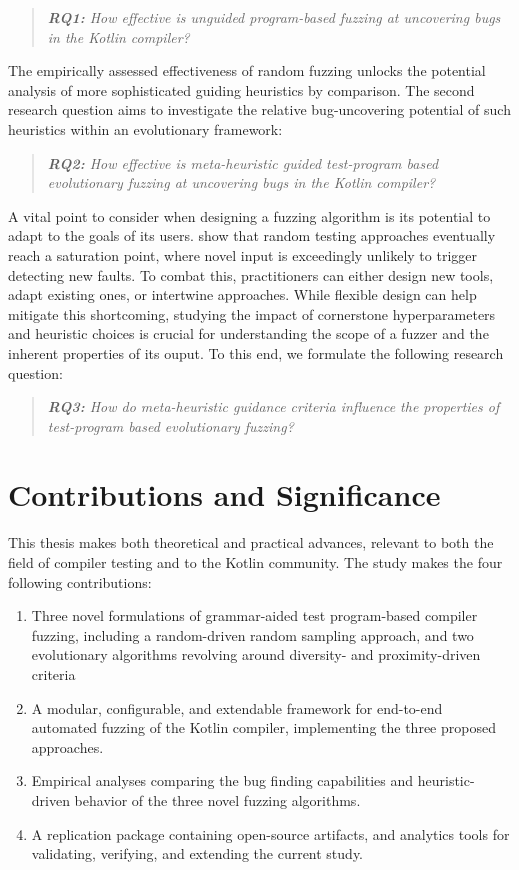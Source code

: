 \begin{quote}
\centering 
\emph{\textbf{RQ1:} How effective is unguided program-based
fuzzing at uncovering bugs in the Kotlin compiler?}
\end{quote}

The empirically assessed effectiveness of random fuzzing
unlocks the potential analysis of more sophisticated guiding
heuristics by comparison.
The second research question aims to investigate
the relative bug-uncovering potential of such heuristics
within an evolutionary framework:


\begin{quote}
\centering 
\emph{\textbf{RQ2:} How effective is meta-heuristic
guided test-program based evolutionary fuzzing
at uncovering bugs in the Kotlin compiler?}
\end{quote}

A vital point to consider when designing a fuzzing algorithm is
its potential to adapt to the goals of its users. \citet{amalfitano2015exploiting}
show that random testing approaches eventually reach a
saturation point, where novel input is exceedingly unlikely to trigger
detecting new faults. 
To combat this, practitioners can either design new tools, adapt existing
ones, or intertwine approaches.
While flexible design can help mitigate this shortcoming, studying the 
impact of cornerstone hyperparameters and heuristic choices
is crucial for understanding the scope of a fuzzer and the
inherent properties of its ouput.
To this end, we formulate the following research question:

\begin{quote}
\centering 
\emph{\textbf{RQ3:} How do meta-heuristic guidance
criteria influence the properties of test-program based
evolutionary fuzzing?}
\end{quote}

\section{Contributions and Significance}

This thesis makes both theoretical and practical advances,
relevant to both the field of compiler testing and to the 
Kotlin community.
The study makes the four following contributions:

\begin{enumerate}
	\item Three novel formulations of grammar-aided test program-based compiler fuzzing,
including a random-driven random sampling approach,
and two evolutionary algorithms revolving
around diversity- and proximity-driven criteria
	\item A modular, configurable, and extendable framework for
end-to-end automated fuzzing of the Kotlin compiler,
implementing the three proposed approaches.
	\item Empirical analyses comparing the bug finding capabilities
and heuristic-driven behavior of the three novel fuzzing algorithms.
	\item A replication package containing open-source artifacts, and analytics tools
for validating, verifying, and extending the current study.
\end{enumerate}

